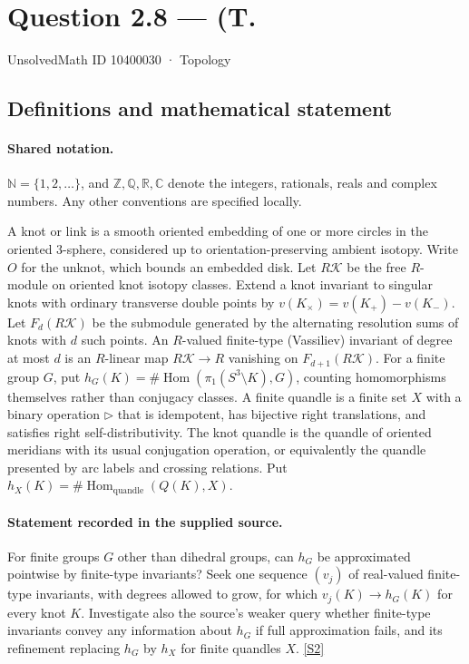 \documentclass[11pt]{article}
\newcommand{\sref}[2]{\hyperlink{source:#1:#2}{[S#2]}}
\begin{document}
\setcounter{section}{10400029}
\section{Question 2.8 — (T.}\label{10400030}
{\small\sffamily UnsolvedMath ID 10400030 · Topology}
\subsection{Definitions and mathematical statement}

\paragraph{Shared notation.}$\mathbb N=\{1,2,\ldots\}$, and $\mathbb Z,\mathbb Q,\mathbb R,\mathbb C$ denote the integers, rationals, reals and complex numbers. Any other conventions are specified locally.


A knot or link is a smooth oriented embedding of one or more circles in the oriented $3$-sphere, considered up to orientation-preserving ambient isotopy. Write $O$ for the unknot, which bounds an embedded disk. Let $R\mathcal K$ be the free $R$-module on oriented knot isotopy classes. Extend a knot invariant to singular knots with ordinary transverse double points by $v(K_\times)=v(K_+)-v(K_-)$. Let $F_d(R\mathcal K)$ be the submodule generated by the alternating resolution sums of knots with $d$ such points. An $R$-valued finite-type (Vassiliev) invariant of degree at most $d$ is an $R$-linear map $R\mathcal K\to R$ vanishing on $F_{d+1}(R\mathcal K)$. For a finite group $G$, put $h_G(K)=\#\operatorname{Hom}(\pi_1(S^3\setminus K),G)$, counting homomorphisms themselves rather than conjugacy classes. A finite quandle is a finite set $X$ with a binary operation $\triangleright$ that is idempotent, has bijective right translations, and satisfies right self-distributivity. The knot quandle is the quandle of oriented meridians with its usual conjugation operation, or equivalently the quandle presented by arc labels and crossing relations. Put $h_X(K)=\#\operatorname{Hom}_{\mathrm{quandle}}(Q(K),X)$.
\paragraph{Statement recorded in the supplied source.}
For finite groups $G$ other than dihedral groups, can $h_G$ be approximated pointwise by finite-type invariants? Seek one sequence $(v_j)$ of real-valued finite-type invariants, with degrees allowed to grow, for which $v_j(K)\to h_G(K)$ for every knot $K$. Investigate also the source's weaker query whether finite-type invariants convey any information about $h_G$ if full approximation fails, and its refinement replacing $h_G$ by $h_X$ for finite quandles $X$. \sref{10400030}{2}
\end{document}
